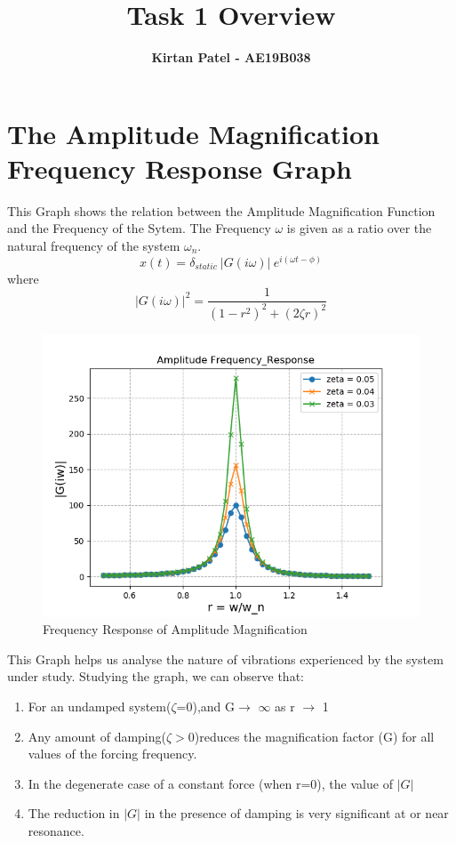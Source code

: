\documentclass{article}
\title{\LARGE{\bf{Task 1 Overview}}}
\author{\Large{\bf{Kirtan Patel - AE19B038}}}
\date{}
\begin{document}
\maketitle 

\section{The Amplitude Magnification Frequency Response Graph}
This Graph shows the relation between the Amplitude Magnification Function and the Frequency of the Sytem. The Frequency $\omega$ is given as a ratio over the natural frequency of the system $\omega_{n}$.
\[x(t) = \delta_{static}~|G(i\omega)|~e^{i(\omega t - \phi)}\]
where
\[|G(i \omega)|^2 = \frac{1}{(1 - r^2)^2 + (2 \zeta r)^2}\]
\begin{figure}
\centering
\includegraphics[scale = 0.56]{Amplitude Frequency_Response.png}
\caption{Frequency Response of Amplitude Magnification}
\label{fig1.}
\end{figure}

This Graph helps us analyse the nature of vibrations experienced by the system under study. Studying the graph, we can observe that:
\begin{enumerate}
	\item For an undamped system($\zeta$=0),and G$\rightarrow$ $\infty$ as r $\rightarrow$ 1
	\item Any amount of damping($\zeta$$>$0)reduces the magnification factor (G) for all values of the forcing frequency.
	\item In the degenerate case of a constant force (when r=0), the value of $|G|$
	\item The reduction in $|G|$ in the presence of damping is very significant at or near resonance.
\end{enumerate}
\end{document}

